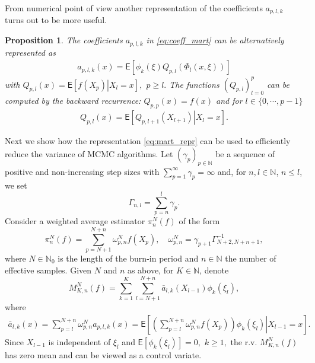 \documentclass[preprint]{imsart}
\newtheorem{prop}[thm]{Proposition}
\begin{document}
From  numerical point of view another representation of the coefficients \(a_{p,l,k}\)  turns out to be more useful.
\begin{prop}
The coefficients \(a_{p,l,k}\) in \eqref{eq:coeff_mart}  can be alternatively represented as
\begin{eqnarray*}
a_{p,l,k}(x)=\mathsf{E}\left[\phi_k\left(\xi\right)Q_{p,l}\left(\Phi_l(x,\xi)\right)\right]
\end{eqnarray*}
with \(Q_{p,l}(x)=\mathsf{E}\left[\left.f(X_{p})\right|X_{l}=x\right],\) \(p\geq l.\)
The functions \((Q_{p,l})_{l=0}^p\)  can be computed by the backward recurrence: $Q_{p,p}(x)=f(x)$ and for $l \in \{0,\cdots,p-1\}$
\begin{eqnarray}
\label{eq:qpl}
Q_{p,l}(x)=\mathsf{E}\left[\left.Q_{p,l+1}(X_{l+1})\right|X_{l}=x\right].
\end{eqnarray}
\end{prop}
Next we show how  the representation \eqref{eq:mart_repr} can be used to efficiently reduce the variance of MCMC algorithms.  Let $(\gamma_{p})_{p\in\mathbb N}$ be a sequence of positive and non-increasing
step sizes
with $\sum_{p=1}^\infty \gamma_p=\infty$
and, for $n,l\in\mathbb{N}$, $n\le l$, we set
\[
\Gamma_{n,l}=\sum_{p=n}^{l}\gamma_{p}.
\]
 Consider a weighted average estimator $\pi_{n}^{N}(f)$ of the form
\begin{equation}\label{eq:29032018a2}
\pi_{n}^{N}(f)=\sum_{p=N+1}^{N+n}\omega_{p,n}^{N}f(X_{p}),\quad\omega_{p,n}^{N}=\gamma_{p+1}\Gamma_{N+2,N+n+1}^{-1},
\end{equation}
where $N\in\mathbb N_0$ is the length of the burn-in period and $n\in\mathbb N$
the number of effective samples.
Given $N$ and $n$ as above, for $K\in\mathbb N$, denote
\begin{equation}
M_{K,n}^N(f) =\sum_{k=1}^{K}\sum_{l=N+1}^{N+n}\bar a_{l,k}(X_{l-1})\phi_k(\xi_{l}),
\label{eq:29032018a5}
\end{equation}
where
\begin{align}
\label{eq:first-expression-bar-a-l-k}
\bar{a}_{l,k}(x)
=\sum_{p=l}^{N+n}\omega_{p,n}^{N}a_{p,l,k}(x)=\mathsf{E}\left[\left.\left(\sum_{p=l}^{N+n}\omega_{p,n}^{N}f(X_{p})\right)\phi_k(\xi_{l})\right|X_{l-1}=x\right].
\end{align}
Since \(X_{l-1}\) is independent of \(\xi_{l}\) and \(\mathsf{E}[\phi_k(\xi_{l})]=0,\) \(k\geq 1,\)  the r.v.  \(M_{K,n}^N(f)\) has zero mean and can be viewed as a control variate. 
\end{document}
